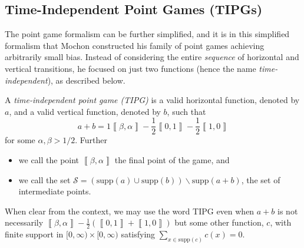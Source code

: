 \documentclass{theoretics}
\newcommand{\supp}{\text{supp}}
\begin{document}
%
%
%
%
%
%
%


%

%
%
%
%
%
%

%
%
%
%
%
%



%



\subsection{Time-Independent Point Games (TIPGs)}
\label{subsec:tipg}

%
%

The point game formalism can be further simplified, and it is in this simplified formalism that Mochon constructed his family of point games achieving arbitrarily small bias. Instead of considering the entire \emph{sequence} of horizontal and vertical transitions,
he focused on just two functions (hence the name \emph{time-independent}), as described below.
\begin{definition}[TIPG]
  \label{def:TIPG}A \emph{time-independent point game (TIPG)} is
  a valid horizontal function, denoted by $a$, and a valid vertical function, denoted by $b$,
  such that
  \begin{displaymath}
    a+b=1\left\llbracket \beta,\alpha\right\rrbracket -\frac{1}{2}\left\llbracket 0,1\right\rrbracket -\frac{1}{2}\left\llbracket 1,0\right\rrbracket
  \end{displaymath}
  for some $\alpha,\beta>1/2$. Further
  \begin{itemize}
    \item we call the point $\left\llbracket \beta,\alpha\right\rrbracket $
          the final point of the game, and
    \item we call the set $\mathcal{S}=\left(\supp(a)\cup\supp(b)\right) \backslash\supp(a+b)$,
          the set of intermediate points.
  \end{itemize}
\end{definition}

\begin{remark}
  When clear from the context, we may use the word TIPG even when $a+b$
  is not necessarily $\left\llbracket \beta,\alpha\right\rrbracket -\frac{1}{2}\left(\left\llbracket 0,1\right\rrbracket +\left\llbracket 1,0\right\rrbracket \right)$
  but some other function, $c$, with finite support in
  $[0,\infty)\times [0,\infty)$
  satisfying $\sum_{x\in\supp(c)}c(x)=0$.
\end{remark}
\end{document}
